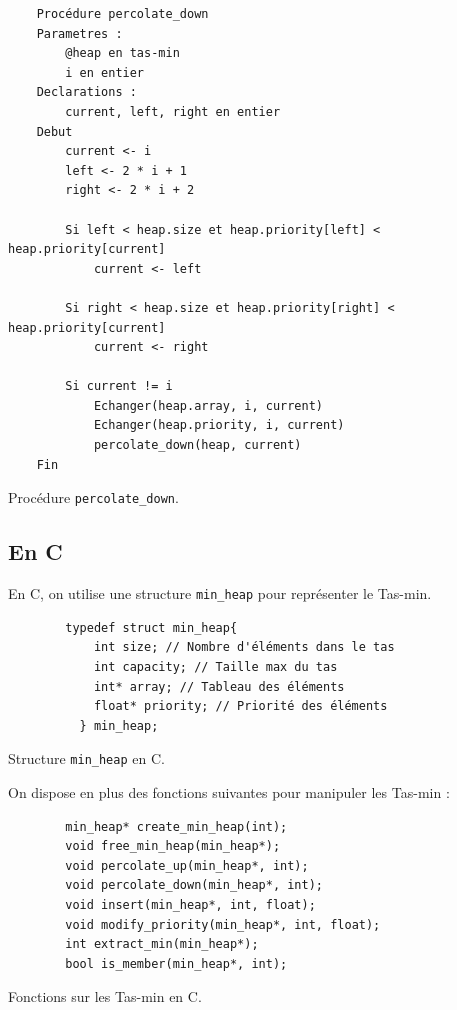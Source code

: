 \begin{listing}[!htpb]
    \begin{verbatim}
    Procédure percolate_down
    Parametres :
        @heap en tas-min
        i en entier
    Declarations :
        current, left, right en entier
    Debut
        current <- i
        left <- 2 * i + 1
        right <- 2 * i + 2

        Si left < heap.size et heap.priority[left] < heap.priority[current]
            current <- left
        
        Si right < heap.size et heap.priority[right] < heap.priority[current]
            current <- right
        
        Si current != i
            Echanger(heap.array, i, current)
            Echanger(heap.priority, i, current)
            percolate_down(heap, current)
    Fin
    \end{verbatim}
    \caption{Procédure \texttt{percolate\_down}.}
    \label{listing:percolate_down}
\end{listing}

\subsection{En C}

En C, on utilise une structure \texttt{min\_heap} pour représenter le Tas-min.

\begin{listing}[!htpb]
    \begin{verbatim}
        typedef struct min_heap{
            int size; // Nombre d'éléments dans le tas
            int capacity; // Taille max du tas
            int* array; // Tableau des éléments
            float* priority; // Priorité des éléments
          } min_heap;
    \end{verbatim}
    \caption{Structure \texttt{min\_heap} en C.}
    \label{listing:c-min_heap}
\end{listing}

\newpage

On dispose en plus des fonctions suivantes pour manipuler les Tas-min :

\begin{listing}[!htpb]
    \begin{verbatim}
        min_heap* create_min_heap(int);
        void free_min_heap(min_heap*);
        void percolate_up(min_heap*, int);
        void percolate_down(min_heap*, int);
        void insert(min_heap*, int, float);
        void modify_priority(min_heap*, int, float);
        int extract_min(min_heap*);
        bool is_member(min_heap*, int); 
    \end{verbatim}
    \caption{Fonctions sur les Tas-min en C.}
    \label{listing:c-min_heap-fonctions}
\end{listing}

